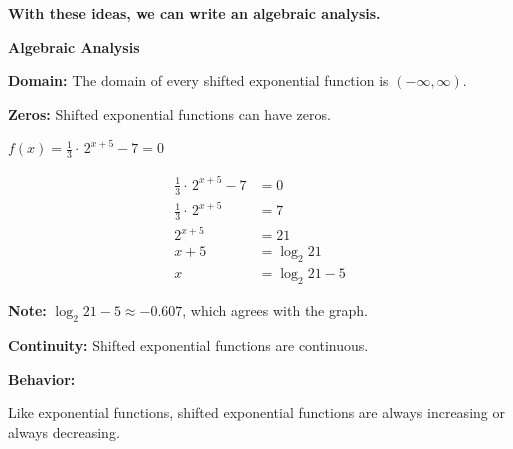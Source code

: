 \documentclass{ximera}
\begin{document}
\begin{example}
\begin{image}
\end{image}







\textbf{\textcolor{red!75!green}{With these ideas, we can write an algebraic analysis.}} 


\textbf{\textcolor{purple!65!blue}{Algebraic Analysis}}










\textbf{Domain:}  The domain of every shifted exponential function is $(-\infty, \infty)$. 



\textbf{Zeros:}  Shifted exponential functions can have zeros.



$f(x) = \frac{1}{3} \cdot \, 2^{x+5} - 7 = 0$ 


\begin{align*}
\frac{1}{3} \cdot \, 2^{x+5} - 7 & = 0 \\
\frac{1}{3} \cdot \, 2^{x+5} & = 7 \\
2^{x+5} & = 21 \\
x+5 & = \log_2{21} \\
x & = \log_2{21} - 5
\end{align*}

\textbf{Note:}  $\log_2{21} - 5 \approx -0.607$, which agrees with the graph. 




\textbf{Continuity:}  Shifted exponential functions are continuous.  








\textbf{Behavior:} 

Like exponential functions, shifted exponential functions are always increasing or always decreasing. 






\end{example}
\end{document}
